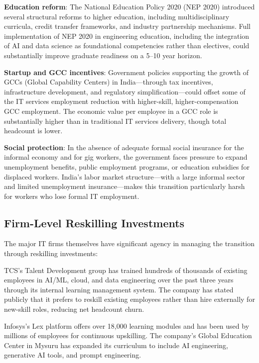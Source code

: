 \documentclass[conference]{IEEEtran}
\begin{document}
\textbf{Education reform}: The National Education Policy 2020 (NEP 2020) introduced several structural reforms to higher education, including multidisciplinary curricula, credit transfer frameworks, and industry partnership mechanisms. Full implementation of NEP 2020 in engineering education, including the integration of AI and data science as foundational competencies rather than electives, could substantially improve graduate readiness on a 5--10 year horizon.

\textbf{Startup and GCC incentives}: Government policies supporting the growth of GCCs (Global Capability Centers) in India---through tax incentives, infrastructure development, and regulatory simplification---could offset some of the IT services employment reduction with higher-skill, higher-compensation GCC employment. The economic value per employee in a GCC role is substantially higher than in traditional IT services delivery, though total headcount is lower.

\textbf{Social protection}: In the absence of adequate formal social insurance for the informal economy and for gig workers, the government faces pressure to expand unemployment benefits, public employment programs, or education subsidies for displaced workers. India's labor market structure---with a large informal sector and limited unemployment insurance---makes this transition particularly harsh for workers who lose formal IT employment.

\subsection{Firm-Level Reskilling Investments}

The major IT firms themselves have significant agency in managing the transition through reskilling investments:

TCS's Talent Development group has trained hundreds of thousands of existing employees in AI/ML, cloud, and data engineering over the past three years through its internal learning management system. The company has stated publicly that it prefers to reskill existing employees rather than hire externally for new-skill roles, reducing net headcount churn.

Infosys's Lex platform offers over 18,000 learning modules and has been used by millions of employees for continuous upskilling. The company's Global Education Center in Mysuru has expanded its curriculum to include AI engineering, generative AI tools, and prompt engineering.
\end{document}
